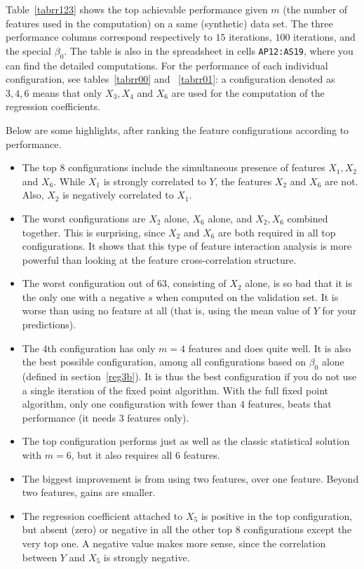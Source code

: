 \documentclass[oneside,10pt]{book}
\begin{document}
Table~\ref{tabrr123} shows the top achievable performance given $m$ (the number of features used in the computation) on a same (synthetic) data set. The three performance columns correspond respectively to $15$ iterations, $100$ iterations, and the special $\beta_0$.  The table is also in the spreadsheet in cells \texttt{AP12:AS19}, where you can find the detailed computations. For the performance of each individual configuration, see tables~\ref{tabrr00} and ~\ref{tabrr01}: a configuration denoted as $3,4,6$ means that only $X_3, X_4$ and $X_6$ are used for the computation of the regression coefficients.


\noindent Below are some highlights, after ranking the feature configurations according to performance.
\begin{itemize}
\item The top $8$ configurations include the simultaneous presence of features $X_1,X_2$ and $X_6$. While $X_1$ is strongly correlated to $Y$, the features $X_2$ and $X_6$ are not. Also, $X_2$ is negatively correlated to $X_1$.
\item The worst configurations are $X_2$ alone, $X_6$ alone, and $X_2, X_6$ combined together. This is surprising, since $X_2$ and $X_6$ are both required in all top configurations. It shows that this type of feature interaction analysis is more powerful than looking at the feature cross-correlation structure.
\item The worst configuration out of $63$, consisting of $X_2$ alone, is so bad that it is the only one with a negative $s$ when computed on the validation set. It is worse than using no feature at all (that is, using the mean value of $Y$ for your predictions).
\item The $4$th configuration has only $m=4$ features and does quite well. It is also the best possible configuration, among all configurations
based on $\beta_0$ alone (defined in section~\ref{reg3b}). It is thus the best configuration if you do not use a single iteration of the fixed point algorithm. With the full fixed point algorithm, only one configuration with fewer than $4$ features, beats that performance (it needs $3$ features only).
\item The top configuration performs just as well as the classic statistical solution with $m=6$, but it also requires all $6$ features.
\item The biggest improvement is from using two features, over one feature. Beyond two features, gains are smaller.
\item The regression coefficient attached to $X_5$ is positive in the top configuration, but absent (zero) or negative in all the other top 8 configurations except the very top one. A negative value makes more sense, since the correlation between $Y$ and $X_5$ is strongly negative.

\end{itemize}
\end{document}
